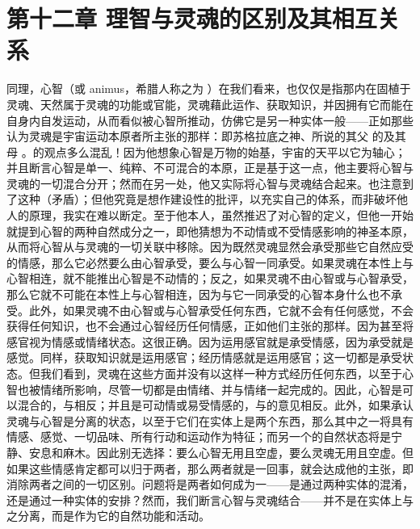 
\section{第十二章 理智与灵魂的区别及其相互关系}

同理，心智（或 animus，希腊人称之为 ）在我们看来，也仅仅是指那内在固植于灵魂、天然属于灵魂的功能或官能，灵魂藉此运作、获取知识，并因拥有它而能在自身内自发运动，从而看似被心智所推动，仿佛它是另一种实体一般——正如那些认为灵魂是宇宙运动本原者所主张的那样：即苏格拉底之神、所说的其父  的及其母 。的观点多么混乱！因为他想象心智是万物的始基，宇宙的天平以它为轴心；并且断言心智是单一、纯粹、不可混合的本原，正是基于这一点，他主要将心智与灵魂的一切混合分开；然而在另一处，他又实际将心智与灵魂结合起来。也注意到了这种（矛盾）；但他究竟是想作建设性的批评，以充实自己的体系，而非破坏他人的原理，我实在难以断定。至于他本人，虽然推迟了对心智的定义，但他一开始就提到心智的两种自然成分之一，即他猜想为不动情或不受情感影响的神圣本原，从而将心智从与灵魂的一切关联中移除。因为既然灵魂显然会承受那些它自然应受的情感，那么它必然要么由心智承受，要么与心智一同承受。如果灵魂在本性上与心智相连，就不能推出心智是不动情的；反之，如果灵魂不由心智或与心智承受，那么它就不可能在本性上与心智相连，因为与它一同承受的心智本身什么也不承受。此外，如果灵魂不由心智或与心智承受任何东西，它就不会有任何感觉，不会获得任何知识，也不会通过心智经历任何情感，正如他们主张的那样。因为甚至将感官视为情感或情绪状态。这很正确。因为运用感官就是承受情感，因为承受就是感觉。同样，获取知识就是运用感官；经历情感就是运用感官；这一切都是承受状态。但我们看到，灵魂在这些方面并没有以这样一种方式经历任何东西，以至于心智也被情绪所影响，尽管一切都是由情绪、并与情绪一起完成的。因此，心智是可以混合的，与相反；并且是可动情或易受情感的，与的意见相反。此外，如果承认灵魂与心智是分离的状态，以至于它们在实体上是两个东西，那么其中之一将具有情感、感觉、一切品味、所有行动和运动作为特征；而另一个的自然状态将是宁静、安息和麻木。因此别无选择：要么心智无用且空虚，要么灵魂无用且空虚。但如果这些情感肯定都可以归于两者，那么两者就是一回事，就会达成他的主张，即消除两者之间的一切区别。问题将是两者如何成为一——是通过两种实体的混淆，还是通过一种实体的安排？然而，我们断言心智与灵魂结合——并不是在实体上与之分离，而是作为它的自然功能和活动。\par

